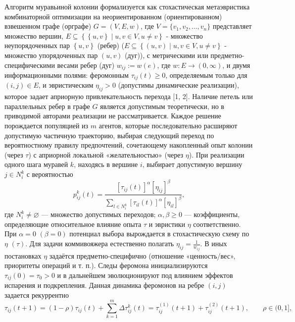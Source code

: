 \documentclass{article}
\newcommand{\1}{\mathds{1}}
\begin{document}
Алгоритм муравьиной колонии формализуется как стохастическая метаэвристика комбинаторной оптимизации на неориентированном (ориентированном) взвешенном графе (орграфе) $G=(V,E, w)$, где $V = \{v_1, v_2, \ldots, v_n\}$ представляет множество вершин, $E \subseteq \left\{ \left\{u, v \right\} \mid u, v \in V, u \neq v  \right\}$ - множество неупорядоченных пар $\left\{u, v \right\}$ (ребер) ($E \subseteq \left\{ \left(u, v \right) \mid u, v \in V, u \neq v \right\}$ - множество упорядоченных пар $(u, v)$ (дуг)), с метрическими или предметно-специфическими весами ребер (дуг) $w_{ij} :=w(e)$, где $w: E \rightarrow \left(0, \infty \right)$, и двумя информационными полями: феромонным $\tau_{ij}(t)\ge 0$, определяемым только для $(i,j) \in E$, и эвристическим $\eta_{ij}>0$ (допустимы динамические реализации), которое задает априорную привлекательность перехода [1, 2]. Наличие петель или параллельных ребер в графе $G$ является допустимым теоретически, но в приводимой авторами реализации не рассматривается. Каждое решение порождается популяцией из $m$ агентов, которые последовательно расширяют допустимую частичную траекторию, выбирая следующий переход по вероятностному правилу предпочтений, сочетающему накопленный опыт колонии (через $\tau$) с априорной локальной «желательностью» (через $\eta$). При реализации одного шага муравей $k$, находясь в вершине $i$, выбирает допустимую вершину $j \in N_i^k$ с вероятностью
\begin{equation}
    p_{ij}^k(t)=\frac{\left[\tau_{ij}(t)\right]^{\alpha}\left[\eta_{ij}\right]^{\beta}}{\sum_{l\in N_i^k}\left[\tau_{il}(t)\right]^{\alpha}\left[\eta_{il}\right]^{\beta}},
\end{equation}
где $N_i^k \neq \varnothing $ — множество допустимых переходов; $\alpha, \beta \ge 0$ — коэффициенты, определяющие относительное влияние опыта $\tau$ и эвристики $\eta$ соответственно. При $\alpha=0$ $\left( \beta=0 \right)$ потенциал выбора вырождается в стохастическую схему по $\eta$ $\left( \tau \right)$. Для задачи коммивояжера естественно полагать $\eta_{ij}=\frac{1}{w_{ij}}$. В иных постановках $\eta$ задаётся предметно-специфично (отношение «ценность/вес», приоритеты операций и т. п.). Следы феромона инициализируются $\tau_{ij}(0)=\tau_0>0$ и в дальнейшем эволюционируют под влиянием эффектов испарения и подкрепления. Данная динамика феромонов на ребре $(i, j)$ задается рекуррентно
\begin{equation}
    \tau_{ij}(t+1)=(1-\rho)\tau_{ij}(t)+\sum_{k=1}^{m}\Delta\tau_{ij}^{k}(t) = \tau_{ij}^{(1)}(t+1) + \tau_{ij}^{(2)}(t+1),\qquad \rho\in(0,1],
\end{equation}
\end{document}
